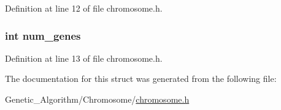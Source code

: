 Definition at line 12 of file chromosome.\+h.

\hypertarget{structchromosome_ae7b31eb7dc984aa11f5413e309a1877c}{}
\subsubsection[{num\+\_\+genes}]{\setlength{\rightskip}{0pt plus 5cm}int num\+\_\+genes}\label{structchromosome_ae7b31eb7dc984aa11f5413e309a1877c}


Definition at line 13 of file chromosome.\+h.



The documentation for this struct was generated from the following file\+:\begin{DoxyCompactItemize}
\item 
Genetic\+\_\+\+Algorithm/\+Chromosome/\hyperlink{chromosome_8h}{chromosome.\+h}\end{DoxyCompactItemize}
